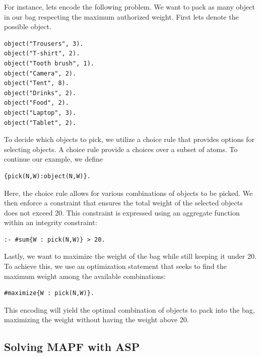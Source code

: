 For instance, lets encode the following problem. We want to pack as many object in our bag respecting the maximum authorized weight. First lets denote the possible object.

\begin{minipage}[H]{\linewidth}
\begin{lstlisting}[style=mystyle]
object("Trousers", 3).
object("T-shirt", 2).
object("Tooth brush", 1).
object("Camera", 2).
object("Tent", 8).
object("Drinks", 2).
object("Food", 2).
object("Laptop", 3).
object("Tablet", 2).
\end{lstlisting}
\end{minipage}
To decide which objects to pick, we utilize a choice rule that provides options for selecting objects. A choice rule provide a choices over a subset of atoms. To continue our example, we define

\begin{minipage}[H]{\linewidth}
\begin{lstlisting}[style=mystyle]
    {pick(N,W):object(N,W)}.
\end{lstlisting}
\end{minipage}
Here, the choice rule allows for various combinations of objects to be picked. We then enforce a constraint that ensures the total weight of the selected objects does not exceed 20. This constraint is expressed using an aggregate function within an integrity constraint:

\begin{minipage}[H]{\linewidth}
\begin{lstlisting}[style=mystyle]
    :- #sum{W : pick(N,W)} > 20. 
\end{lstlisting}
\end{minipage}

Lastly, we want to maximize the weight of the bag while still keeping it under 20. To achieve this, we use an optimization statement that seeks to find the maximum weight among the available combinations:

\begin{minipage}[H]{\linewidth}
\begin{lstlisting}[style=mystyle]
    #maximize{W : pick(N,W)}. 
\end{lstlisting}
\end{minipage}
This encoding will yield the optimal combination of objects to pack into the bag, maximizing the weight without having the weight above 20.

\subsection{Solving MAPF with ASP}

